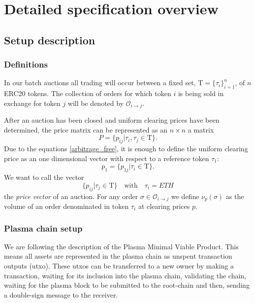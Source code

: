 \documentclass[11pt,parskip=full]{scrartcl}%
\newcommand{\Tau}{\mathrm{T}}
\def\pO{\mathcal{O}}
\def\ra{\rightarrow}
\newcommand*{\erc}{ERC20 }
\begin{document}
\newpage

\section{Detailed specification overview}
\subsection{Setup description}

\subsubsection{Definitions}


In our batch auctions all trading will occur between a fixed set, $\Tau = \{\tau_i\}_{i=1}^n$, of $n$ \erc tokens. The collection of orders for which token $i$ is being sold in exchange for token $j$ will be denoted by $\pO_{i\ra j}$. 

After an auction has been closed and uniform clearing prices have been determined, the price matrix can be represented as an $n\times n$ a matrix 
\[P = \{p_{ij}| \tau_i, \tau_j \in \Tau \}.\]
Due to the equations \ref{arbitrage_free}, it is enough to define the uniform clearing price as an one dimensional vector with respect to a reference token $\tau_1$:
\[p_1 = \{p_{1j}| \tau_i \in \Tau \}.\]
We want to call the vector
\begin{equation}
\{ p_{ij}| \tau_j \in \Tau \} \quad \text{with} \quad \tau_i =ETH
\label{pricevector}
\end{equation}
the \emph{price vector} of an auction.\newline
For any order $\sigma \in \pO_{i\ra j}$ we define $\nu_p(\sigma)$ as the volume of an order denominated in token $\tau_i$ at clearing prices $p$.


\subsubsection{Plasma chain setup}
We are following the description of the Plasma Minimal Viable Product\cite{MVP}. 
This means all assets are represented in the plasma chain as unspent transaction outputs (utxo). 
These utxos can be transferred to a new owner by making a transaction, waiting for its inclusion into the plasma chain, validating the chain, waiting for the plasma block to be submitted to the root-chain and then, sending a double-sign message to the receiver. 
\end{document}
